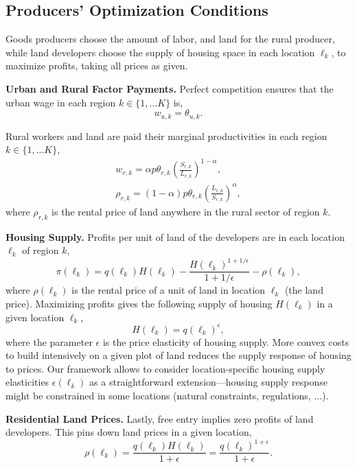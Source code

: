 \documentclass[20250130-paper.tex]{subfiles}
\begin{document}
\subsection{Producers' Optimization Conditions}
\label{subsec:PPopt}

Goods producers choose the amount of labor, and land for the rural producer, while land developers choose the supply of housing space in each location $\ell_k$, to maximize profits, taking all prices as given.

\textbf{Urban and Rural Factor Payments.} Perfect competition ensures that the urban wage in each region $k \in \{1,...K\}$ is,
\begin{equation}
w_{u,k}=\theta_{u,k}. \label{eq:mpu}
\end{equation}

Rural workers and land are paid their marginal productivities in each region  $k \in \{1,...K\}$,
\begin{eqnarray}
w_{r,k}=\alpha p\theta_{r,k}\left(\frac{S_{r,k}}{L_{r,k}}\right)^{1-\alpha}, \label{eq:foc-w}\\
\rho_{r,k}=(1-\alpha)p\theta_{r,k} \left(\frac{L_{r,k}}{S_{r,k}}\right)^{\alpha}, \label{eq:foc-q}
\end{eqnarray}
where $\rho_{r,k}$ is the rental price of land anywhere in the rural sector of region $k$.

\textbf{Housing Supply.} Profits per unit of land of the developers are in each location $\ell_k$ of region $k$,
$$\pi(\ell_k)=q(\ell_k)H(\ell_k)-\frac{H(\ell_k)^{1+1/\epsilon}}{1+1/\epsilon}-\rho(\ell_k),$$
where $\rho(\ell_k)$ is the rental price of a unit of land in location $\ell_k$ (the land price). Maximizing profits gives the following supply of housing $H(\ell_k)$ in a given location $\ell_k$,
\begin{equation}
H(\ell_k)=q(\ell_k) ^{\epsilon}, \label{eq:Hsupply}
\end{equation}
where the parameter $\epsilon$ is the price elasticity of housing supply. More convex costs to build intensively on a given plot of land reduces the supply response of housing to prices. Our framework allows to consider location-specific housing supply elasticities $\epsilon(\ell_k)$ as a straightforward extension---housing supply response might be constrained in some locations (natural constraints, regulations, ...).

\textbf{Residential Land Prices.} Lastly, free entry implies zero profits of land developers. This pins down land prices in a given location,
\begin{equation}
\rho(\ell_k)=\frac{q(\ell_k)H(\ell_k)}{1+\epsilon}=\frac{q(\ell_k)^{1+\epsilon}}{ 1+\epsilon}. \label{eq:q_r_supply}
\end{equation}
\end{document}
